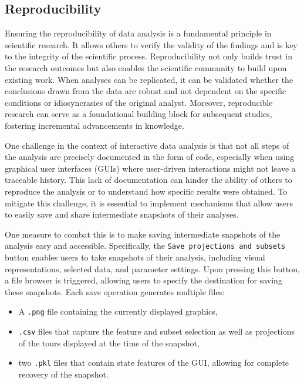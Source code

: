 \documentclass[article]{ajs}
\begin{document}
\subsection{Reproducibility}

Ensuring the reproducibility of data analysis is a fundamental principle in scientific research. It allows others to verify the validity of the findings and is key to the integrity of the scientific process. Reproducibility not only builds trust in the research outcomes but also enables the scientific community to build upon existing work. When analyses can be replicated, it can be validated whether the conclusions drawn from the data are robust and not dependent on the specific conditions or idiosyncrasies of the original analyst. Moreover, reproducible research can serve as a foundational building block for subsequent studies, fostering incremental advancements in knowledge.

One challenge in the context of interactive data analysis is that not all steps of the analysis are precisely documented in the form of code, especially when using graphical user interfaces (GUIs) where user-driven interactions might not leave a traceable history. This lack of documentation can hinder the ability of others to reproduce the analysis or to understand how specific results were obtained. To mitigate this challenge, it is essential to implement mechanisms that allow users to easily save and share intermediate snapshots of their analyses.

One measure to combat this is to make saving intermediate snapshots of the analysis easy and accessible. Specifically, the \texttt{Save projections and subsets} button enables users to take snapshots of their analysis, including visual representations, selected data, and parameter settings. Upon pressing this button, a file browser is triggered, allowing users to specify the destination for saving these snapshots. Each save operation generates multiple files:


\begin{itemize}
    \item A \texttt{.png} file containing the currently displayed graphics,
    \item \texttt{.csv} files that capture the feature and subset selection as well as projections of the tours displayed at the time of the snapshot,
    \item two \texttt{.pkl} files that contain state features of the GUI, allowing for complete recovery of the snapshot.
\end{itemize}
\end{document}
